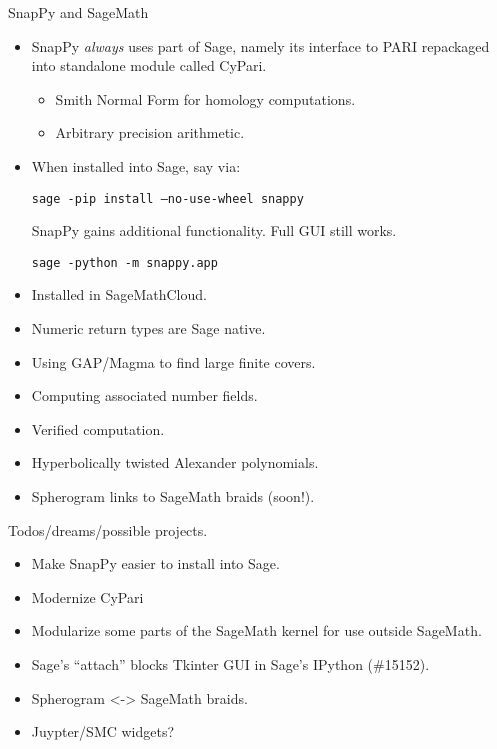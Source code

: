 \documentclass[aspect=16:10, tikz, half]{nmd/slide}
\begin{document}
\begin{frame}
  SnapPy and SageMath
  \begin{itemize}
  \item SnapPy \emph{always} uses part of Sage, namely its interface
    to PARI repackaged into standalone module called CyPari.

    \begin{itemize}
    \item Smith Normal Form for homology computations.
    \item Arbitrary precision arithmetic.
    \end{itemize}

    \item When installed into Sage, say via:

      \texttt{\small{sage -pip install --no-use-wheel snappy}}

      SnapPy gains additional functionality.  Full GUI still works.  

      \texttt{sage -python -m snappy.app}

    \item Installed in SageMathCloud. 
    \end{itemize}
\end{frame}

\begin{frame}
  \begin{itemize}
  \item Numeric return types are Sage native.
  \item Using GAP/Magma to find large finite covers.
  \item Computing associated number fields. 
  \item Verified computation.
  \item Hyperbolically twisted Alexander polynomials. 
  \item Spherogram links to SageMath braids (soon!).
  \end{itemize}
\end{frame}


\begin{frame}
  Todos/dreams/possible projects.
  \begin{itemize}
  \item Make SnapPy easier to install into Sage.  
  \item Modernize CyPari
  \item Modularize some parts of the SageMath kernel for use outside
    SageMath.
  \item Sage's ``attach'' blocks Tkinter GUI in Sage's IPython (\#15152).
  \item Spherogram <-> SageMath braids. 
  \item Juypter/SMC widgets?
  \end{itemize}
\end{frame}
\end{document}
